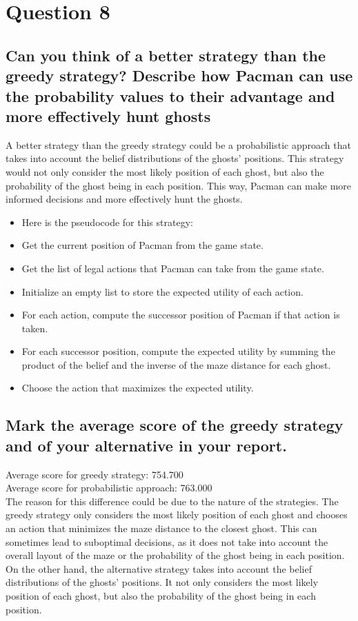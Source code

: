 \documentclass[11pt]{article}
\begin{document}
\section*{Question 8}

\subsection*{Can you think of a better strategy than the greedy strategy? Describe how Pacman can use the probability values to their advantage and more effectively hunt ghosts}
A better strategy than the greedy strategy could be a probabilistic approach that takes into account the belief distributions of the ghosts' positions.
This strategy would not only consider the most likely position of each ghost, but also the probability of the ghost being in each position.
This way, Pacman can make more informed decisions and more effectively hunt the ghosts.
\begin{itemize}
    \item Here is the pseudocode for this strategy:
    \item Get the current position of Pacman from the game state.
    \item Get the list of legal actions that Pacman can take from the game state.
    \item Initialize an empty list to store the expected utility of each action.
    \item For each action, compute the successor position of Pacman if that action is taken.
    \item For each successor position, compute the expected utility by summing the product of the belief and the inverse of the maze distance for each ghost.
    \item Choose the action that maximizes the expected utility.
\end{itemize}

\subsection*{Mark the average score of the greedy strategy and of your alternative in your report.}

    Average score for greedy strategy: 754.700\\
    Average score for probabilistic approach: 763.000\\
    The reason for this difference could be due to the nature of the strategies.
    The greedy strategy only considers the most likely position of each ghost and chooses an action that minimizes the maze distance to the closest ghost.
    This can sometimes lead to suboptimal decisions, as it does not take into account the overall layout of the maze or the probability of the ghost being in each position.
    On the other hand, the alternative strategy takes into account the belief distributions of the ghosts' positions.
    It not only considers the most likely position of each ghost, but also the probability of the ghost being in each position.
\end{document}
